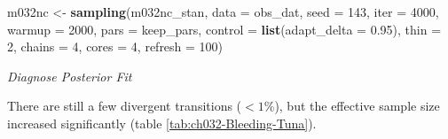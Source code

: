 \documentclass[11pt, oneside, openany]{scrbook}
\newenvironment{Shaded}{\begin{snugshade}}{\end{snugshade}}
\newcommand{\CommentTok}[1]{\textcolor[rgb]{0.56,0.35,0.01}{\textit{#1}}}
\newcommand{\DataTypeTok}[1]{\textcolor[rgb]{0.13,0.29,0.53}{#1}}
\newcommand{\DecValTok}[1]{\textcolor[rgb]{0.00,0.00,0.81}{#1}}
\newcommand{\FloatTok}[1]{\textcolor[rgb]{0.00,0.00,0.81}{#1}}
\newcommand{\KeywordTok}[1]{\textcolor[rgb]{0.13,0.29,0.53}{\textbf{#1}}}
\newcommand{\NormalTok}[1]{#1}
\newcommand{\StringTok}[1]{\textcolor[rgb]{0.31,0.60,0.02}{#1}}
\begin{document}

\begin{Shaded}
\begin{Highlighting}[]
\NormalTok{m032nc <-}\StringTok{ }\KeywordTok{sampling}\NormalTok{(m032nc_stan, }\DataTypeTok{data =}\NormalTok{ obs_dat, }\DataTypeTok{seed =} \DecValTok{143}\NormalTok{,}
                   \DataTypeTok{iter =} \DecValTok{4000}\NormalTok{, }\DataTypeTok{warmup =} \DecValTok{2000}\NormalTok{, }\DataTypeTok{pars =}\NormalTok{ keep_pars,}
                   \DataTypeTok{control =} \KeywordTok{list}\NormalTok{(}\DataTypeTok{adapt_delta =} \FloatTok{0.95}\NormalTok{), }\DataTypeTok{thin =} \DecValTok{2}\NormalTok{,}
                   \DataTypeTok{chains =} \DecValTok{4}\NormalTok{, }\DataTypeTok{cores =} \DecValTok{4}\NormalTok{, }\DataTypeTok{refresh =} \DecValTok{100}\NormalTok{)}
\end{Highlighting}
\end{Shaded}


\emph{Diagnose Posterior Fit}


\begin{Shaded}
\end{Shaded}


There are still a few divergent transitions (\(<1\%\)), but the effective sample size increased significantly (table \ref{tab:ch032-Bleeding-Tuna}).
\end{document}
